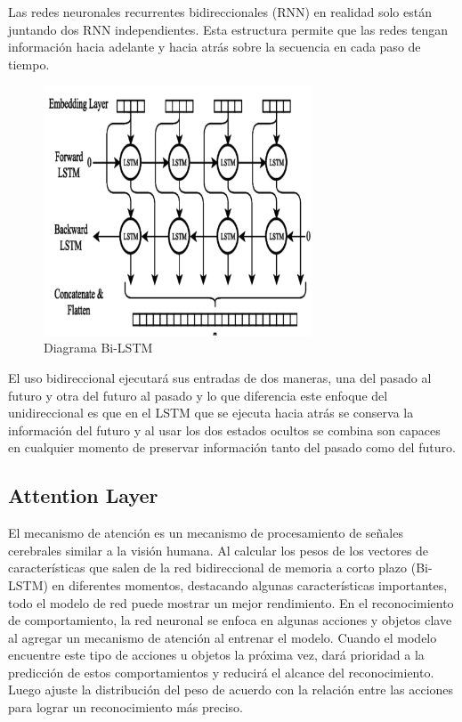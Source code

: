 \documentclass[sigplan,screen]{acmart}
\begin{document}
Las redes neuronales recurrentes bidireccionales (RNN) en realidad solo están juntando dos RNN independientes. Esta estructura permite que las redes tengan información hacia adelante y hacia atrás sobre la secuencia en cada paso de tiempo.
\begin{figure}[H]
\includegraphics[width=8cm]{Imagen 1.png}
\centering
\caption{Diagrama Bi-LSTM}
\end{figure}
El uso bidireccional ejecutará sus entradas de dos maneras, una del pasado al futuro y otra del futuro al pasado y lo que diferencia este enfoque del unidireccional es que en el LSTM que se ejecuta hacia atrás se conserva la información del futuro y al usar los dos estados ocultos se combina son capaces en cualquier momento de preservar información tanto del pasado como del futuro. \cite{gao2018exploiting}
\subsection{Attention Layer}
El mecanismo de atención es un mecanismo de procesamiento de señales cerebrales similar a la visión humana. Al calcular los pesos de los vectores de características que salen de la red bidireccional de memoria a corto plazo (Bi-LSTM) en diferentes momentos, destacando algunas características importantes, todo el modelo de red puede mostrar un mejor rendimiento. En el reconocimiento de comportamiento, la red neuronal se enfoca en algunas acciones y objetos clave al agregar un mecanismo de atención al entrenar el modelo. Cuando el modelo encuentre este tipo de acciones u objetos la próxima vez, dará prioridad a la predicción de estos comportamientos y reducirá el alcance del reconocimiento. Luego ajuste la distribución del peso de acuerdo con la relación entre las acciones para lograr un reconocimiento más preciso.
\end{document}
